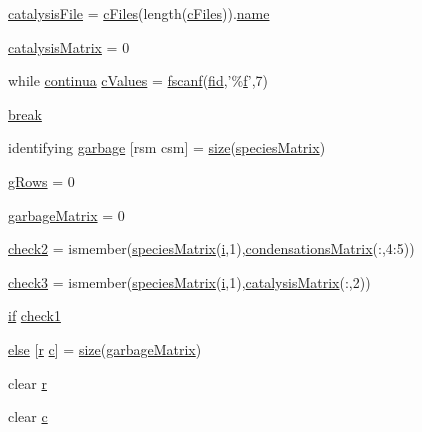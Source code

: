 \begin{DoxyCompactItemize}
\item 
\hyperlink{a00027_a33e70cf5b45cb59005b82d30202f0b69}{catalysis\+File} = \hyperlink{a00030_a9eab57ccb42a39c704f47dc30e4f4515}{c\+Files}(length(\hyperlink{a00030_a9eab57ccb42a39c704f47dc30e4f4515}{c\+Files})).\hyperlink{a00027_abbf559a76fab59203496b0847ab9502a}{name}
\item 
\hyperlink{a00027_a0810027f58d6be965e44b7b84c44ace8}{catalysis\+Matrix} = 0
\item 
while \hyperlink{a00030_a9c951ebd5bc3f1adce943bee1255f4d6}{continua} \hyperlink{a00027_ad4ba7701967c1da20171228afccb7081}{c\+Values} = \hyperlink{a00025_a028ac102a731e62fb0a7439381f566c1}{fscanf}(\hyperlink{a00031_ae9011d40c6f13e68e6f07156e0da7c5d}{fid},'\%\hyperlink{a00025_a9c5a71c46b1abb8b7df5ebeac6c81535}{f}',7)
\item 
\hyperlink{a00027_a91cf6fbebedd86150a36e5ac3d5d3bfc}{break}
\item 
identifying \hyperlink{a00027_abe2562f47a009cdc636cec6fe7b1036b}{garbage} \mbox{[}rsm csm\mbox{]} = \hyperlink{a00104_ae113ea7f9e515a12ac4b5595c6faf61e}{size}(\hyperlink{a00027_ab9e70ab48bc489696c53ad7946d9dfd2}{species\+Matrix})
\item 
\hyperlink{a00027_af33e0ef530936979d29418a30cb262d0}{g\+Rows} = 0
\item 
\hyperlink{a00027_a81fbeed23d0dfd3b031fce1839f131fe}{garbage\+Matrix} = 0
\item 
\hyperlink{a00027_a98a8838a85ed24032563a44271b1525a}{check2} = ismember(\hyperlink{a00027_ab9e70ab48bc489696c53ad7946d9dfd2}{species\+Matrix}(\hyperlink{a00113_ad3efca1ea6e3333daf30719ee0501862}{i},1),\hyperlink{a00030_a84a949cdae2c03193c84caf27f855b30}{condensations\+Matrix}(\+:,4\+:5))
\item 
\hyperlink{a00027_adfd17509248a56986475a25ee50fe488}{check3} = ismember(\hyperlink{a00027_ab9e70ab48bc489696c53ad7946d9dfd2}{species\+Matrix}(\hyperlink{a00113_ad3efca1ea6e3333daf30719ee0501862}{i},1),\hyperlink{a00030_a244eec8903103b5bbddef461276286ce}{catalysis\+Matrix}(\+:,2))
\item 
\hyperlink{a00030_a01d55766b8058903dd360b4bda71f9f5}{if} \hyperlink{a00027_a62c10db322670bdabb633eb294c4fcec}{check1}
\item 
\hyperlink{a00027_af5946383720aa572eb93e1e63afc23c2}{else} \mbox{[}\hyperlink{a00031_ac862e7284527eb913b1351c8bfb8e079}{r} \hyperlink{a00035_a6be92348ba85ef257b11d06209e1d7b6}{c}\mbox{]} = \hyperlink{a00104_ae113ea7f9e515a12ac4b5595c6faf61e}{size}(\hyperlink{a00027_acdc35755c8d07d7b7df426e77ae26506}{garbage\+Matrix})
\item 
clear \hyperlink{a00027_ac862e7284527eb913b1351c8bfb8e079}{r}
\item 
clear \hyperlink{a00027_a8e54ca14679a1ce9245a3b7d55d95570}{c}
\end{DoxyCompactItemize}


